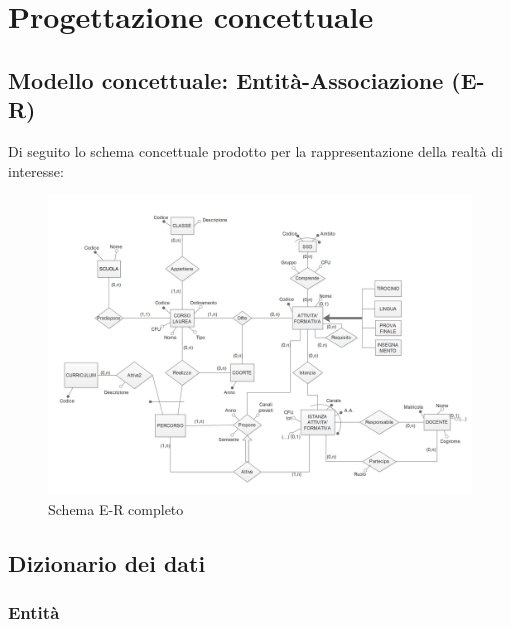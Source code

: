 \documentclass[a4paper,12pt,italian,towside]{article}
\begin{document}
\newpage
\clearpage
\section{Progettazione concettuale}

\subsection{Modello concettuale: Entit\`a-Associazione (E-R)}
Di seguito lo schema concettuale prodotto per la rappresentazione della realt\`a di interesse:

\begin{figure}[!h] %
	\caption{Schema E-R completo}
	\begin{center}
		\includegraphics[scale=0.5,angle=90]{../Schemas/ER_diagram.jpg}
	\end{center}
\end{figure}

\subsection{Dizionario dei dati}

\subsubsection{Entit\`a}
\end{document}
